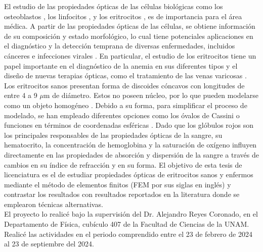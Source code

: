 \documentclass[9pt,letterpaper]{article}
\begin{document}
	El estudio de las propiedades ópticas de las células biológicas como los osteoblastos \cite{Osteoblastos}, los linfocitos \cite{Linfocitos}, y los eritrocitos \cite{Blood}, es de importancia para el área médica. A partir de las propiedades ópticas de las células, se obtiene información de su composición y estado morfológico, lo cual tiene potenciales aplicaciones en el diagnóstico y la detección temprana de diversas enfermedades, incluidos cánceres e infecciones virales \cite{Linfocitos}. En particular, el estudio de los eritrocitos tiene un papel importante en el diagnóstico de la anemia en sus diferentes tipos y el diseño de nuevas terapias ópticas, como el tratamiento de las venas varicosas \cite{Blood}. \\
	
	Los eritrocitos sanos presentan forma de discoides cóncavos con longitudes de entre 4 a 9 $\mu$m de diámetro. Estos no poseen núcleo, por lo que pueden modelarse como un objeto homogéneo \cite{Cassini}. Debido a su forma, para simplificar el proceso de modelado, se han empleado diferentes opciones como los óvalos de Cassini \cite{Cassini} o funciones en términos de coordenadas esféricas \cite{Esferico}. Dado que los glóbulos rojos son los principales responsables de las propiedades ópticas de la sangre, su hematocrito, la concentración de hemoglobina y la saturación de oxígeno influyen directamente en las propiedades de absorción y dispersión de la sangre a través de cambios en su índice de refracción y en su forma. El objetivo de esta tesis de licenciatura es el de estudiar propiedades ópticas de eritrocitos sanos y enfermos mediante el método de elementos finitos (FEM por sus siglas en inglés) y contrastar los resultados con resultados reportados en la literatura donde se emplearon técnicas alternativas.\\
	
	
	 El proyecto lo realicé bajo la supervisión del Dr. Alejandro Reyes Coronado, en el Departamento de Física, cubículo 407 de la Facultad de Ciencias de la UNAM. Realicé las actividades en el periodo comprendido entre el 23 de febrero de 2024 al 23 de septiembre del 2024. \\
	
\end{document}
